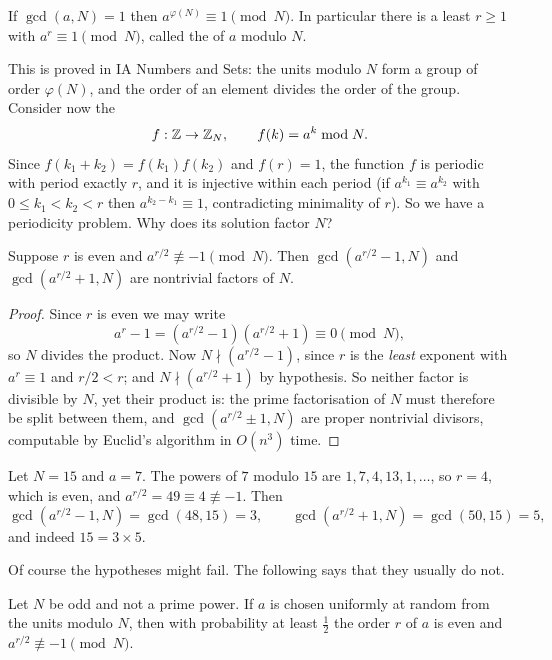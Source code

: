 \documentclass[a4paper]{scrartcl}
\begin{document}
\begin{theorem}[Euler]
	If $\gcd(a,N)=1$ then $a^{\varphi(N)}\equiv1\pmod N$. In particular there is a least $r\geq1$ with $a^r\equiv1\pmod N$, called the  of $a$ modulo $N$.
\end{theorem}

This is proved in IA Numbers and Sets: the units modulo $N$ form a group of order $\varphi(N)$, and the order of an element divides the order of the group. Consider now the 
$$f:\mathbb{Z}\to\mathbb{Z}_N, \qquad f(k) = a^k\bmod N.$$
Since $f(k_1+k_2) = f(k_1)f(k_2)$ and $f(r)=1$, the function $f$ is periodic with period exactly $r$, and it is injective within each period (if $a^{k_1}\equiv a^{k_2}$ with $0\le k_1<k_2<r$ then $a^{k_2-k_1}\equiv1$, contradicting minimality of $r$). So we have a periodicity problem. Why does its solution factor $N$?

\begin{proposition}
	Suppose $r$ is even and $a^{r/2}\not\equiv-1\pmod N$. Then $\gcd(a^{r/2}-1,N)$ and $\gcd(a^{r/2}+1,N)$ are nontrivial factors of $N$.
\end{proposition}

\begin{proof}
	Since $r$ is even we may write
	$$a^r - 1 = \left(a^{r/2}-1\right)\left(a^{r/2}+1\right)\equiv 0\pmod N,$$
	so $N$ divides the product. Now $N\nmid(a^{r/2}-1)$, since $r$ is the \emph{least} exponent with $a^r\equiv1$ and $r/2 < r$; and $N\nmid(a^{r/2}+1)$ by hypothesis. So neither factor is divisible by $N$, yet their product is: the prime factorisation of $N$ must therefore be split between them, and $\gcd(a^{r/2}\pm1,N)$ are proper nontrivial divisors, computable by Euclid's algorithm in $O(n^3)$ time.
\end{proof}

\begin{example}
	Let $N = 15$ and $a = 7$. The powers of $7$ modulo $15$ are $1,7,4,13,1,\dots$, so $r = 4$, which is even, and $a^{r/2} = 49 \equiv 4\not\equiv-1$. Then
	$$\gcd(a^{r/2}-1, N) = \gcd(48,15)=3, \qquad \gcd(a^{r/2}+1,N)=\gcd(50,15)=5,$$
	and indeed $15 = 3\times5$.
\end{example}

Of course the hypotheses might fail. The following says that they usually do not.

\begin{theorem}
	Let $N$ be odd and not a prime power. If $a$ is chosen uniformly at random from the units modulo $N$, then with probability at least $\tfrac12$ the order $r$ of $a$ is even and $a^{r/2}\not\equiv-1\pmod N$.
\end{theorem}
\end{document}

